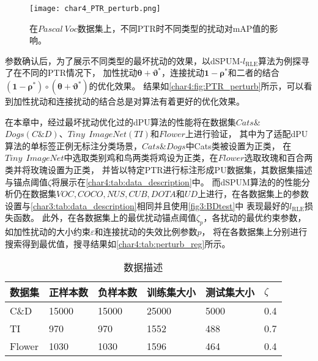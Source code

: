 \begin{figure}[htbp]
    \centering
    \texttt{[image: char4\_PTR\_perturb.png]}
    \caption{\label{char4:fig:PTR_perturb}在$Pascal~Voc$数据集上，不同PTR时不同类型的扰动对mAP值的影响。}
\end{figure}
参数确认后，为了展示不同类型的最坏扰动的效果，以dSPUM-$l_{\mathrm{RLE}}$算法为例探寻了在不同的PTR情况下，
加性扰动$\boldsymbol\theta+\boldsymbol \vartheta^*$，连接扰动$\boldsymbol 1-\boldsymbol \rho^*$和二者的结合
$\left(\boldsymbol 1-\boldsymbol \rho^*\right)\circ\left(\boldsymbol \theta+\boldsymbol \vartheta^* \right)$的优化效果。
结果如\autoref{char4:fig:PTR_perturb}所示，可以看到加性扰动和连接扰动的结合总是对算法有着更好的优化效果。


在本章中，经过最坏扰动优化过的dPU算法的性能将在数据集$Cats$\&$Dogs\left(C\&D\right)$、$Tiny~~ImageNet\left(TI\right)$和$Flower$上进行验证，
其中为了适配dPU算法的单标签正例无标注分类场景，$Cats$\&$Dogs$中Cats类被设置为正类，
在$Tiny~~ImageNet$中选取类别鸡和鸟两类将鸡设为正类，在$Flower$选取玫瑰和百合两类并将玫瑰设置为正类，
并皆以特定PTR进行标注形成PU数据集，其数据集描述与锚点阈值$\zeta$将展示在\autoref{char4:tab:data_description}中。
而dSPUM算法的的性能分析仍在数据集$VOC,COCO,NUS,CUB,DOTA$和$UD$上进行，在各数据集上的参数设置与\autoref{char3:tab:data_description}相同并且使用\autoref{fig3:BDtest}中
表现最好的$l_{\mathrm{RLE}}$损失函数。
此外，在各数据集上的最优扰动锚点阈值$\zeta_p$，各扰动的最优约束参数，如加性扰动的大小约束$\varepsilon$和连接扰动的失效比例参数$p$，
将在各数据集上分别进行搜索得到最优值，搜寻结果如\autoref{char4:tab:perturb_reg}所示。
\begin{table}[htbp]
    \caption{\label{char4:tab:data_description}数据描述}
    \begin{tabularx}{\textwidth}{XXXXXX}
        \hline
        数据集 & 正样本数 & 负样本数 & 训练集大小 & 测试集大小 & $\zeta$ \\ \hline
        C\&D & 15000 & 15000 & 25000 & 5000 & 0.4 \\
        TI & 970 & 970 & 1552 & 488 & 0.7 \\
        Flower & 1030 & 1030 & 1596 & 464 & 0.4 \\ \hline
    \end{tabularx}
\end{table}
